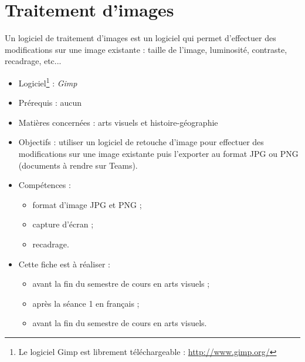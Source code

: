 \chapter{Traitement d'images}\label{ficheImage1}  

Un logiciel de traitement d'images est un logiciel qui permet d'effectuer des modifications sur une image existante : taille de l'image, luminosité, contraste, recadrage, etc...\\


{\footnotesize
\begin{itemize}
\item Logiciel\footnote{Le logiciel Gimp est librement téléchargeable : \url{http://www.gimp.org/}} : \emph{Gimp}
\item Prérequis : aucun
\item Matières concernées : arts visuels et histoire-géographie
\item Objectifs : utiliser un logiciel de retouche d'image pour effectuer des modifications sur une image existante puis l'exporter au format JPG ou PNG (documents à rendre sur Teams).
\item Compétences : 
        \begin{itemize}
        \item format d'image JPG et PNG ;
        \item capture d'écran ;
        \item recadrage.
        \end{itemize}
\item Cette fiche est à réaliser :
        \begin{itemize}
        \item avant la fin du semestre de cours en arts visuels ;
        \item après la séance 1 en français  ;
        \item avant la fin du semestre de cours en arts visuels. 
        \end{itemize}
\end{itemize}
}




